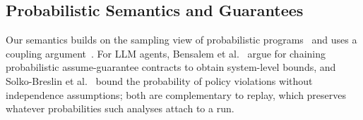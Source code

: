\subsection{Probabilistic Semantics and Guarantees}

Our semantics builds on the sampling view of probabilistic programs~\citep{kozen1981semantics,borgstrom2016probabilistic}
and uses a coupling argument~\citep{barthe2015coupling}.
For LLM agents, Bensalem et al.~\citep{bensalem2026threelayer} argue for chaining probabilistic
assume-guarantee contracts to obtain system-level bounds, and Solko-Breslin et
al.~\citep{solkobreslin2026probverif} bound the probability of policy violations without
independence assumptions; both are complementary to replay, which preserves whatever
probabilities such analyses attach to a run.
